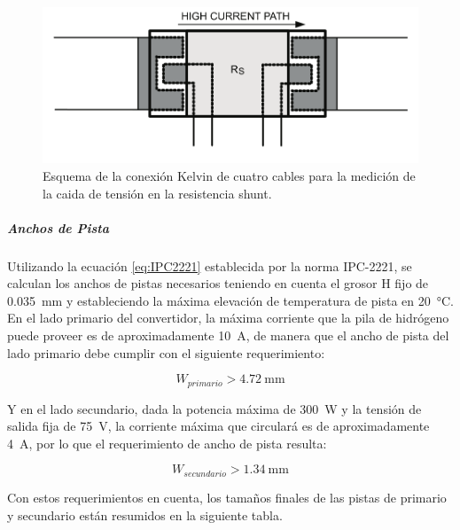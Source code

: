 \begin{figure}[h]
    \centering
    \includegraphics[scale=0.9]{Imagenes/Conexion Kelvin.png}
    \caption{Esquema de la conexión Kelvin de cuatro cables para la medición de la caida de tensión en la resistencia shunt.}
    \label{fig:ConexionShunt}
\end{figure}

\subparagraph{Anchos de Pista}

Utilizando la ecuación \ref{eq:IPC2221} establecida por la norma IPC-2221, se calculan los anchos de pistas necesarios teniendo en cuenta el grosor H fijo de \SI[]{0.035}[]{\milli\metre} y estableciendo la máxima elevación de temperatura de pista en \SI[]{20}[]{\celsius}.\\

En el lado primario del convertidor, la máxima corriente que la pila de hidrógeno puede proveer es de aproximadamente \SI[]{10}[]{\ampere}, de manera que el ancho de pista del lado primario debe cumplir con el siguiente requerimiento:

\begin{equation}\label{eq:Wprimario}
    W_{primario} > \SI[]{4.72}[]{\milli\metre}
\end{equation}

Y en el lado secundario, dada la potencia máxima de \SI[]{300}[]{\watt} y la tensión de salida fija de \SI[]{75}[]{\volt}, la corriente máxima que circulará es de aproximadamente \SI[]{4}[]{\ampere}, por lo que el requerimiento de ancho de pista resulta:

\begin{equation}\label{eq:Wsecundario}
    W_{secundario} > \SI[]{1.34}[]{\milli\metre}
\end{equation}

Con estos requerimientos en cuenta, los tamaños finales de las pistas de primario y secundario están resumidos en la siguiente tabla.\\

